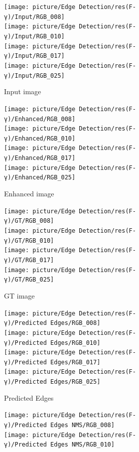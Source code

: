 \documentclass[a4paper]{ctexart}
\begin{document}
	\begin{figure}[htbp]
		\centering
		\begin{subfigure}{0.16\textwidth}
			\texttt{[image: picture/Edge Detection/res(F-γ)/Input/RGB\_008]} \\
			\texttt{[image: picture/Edge Detection/res(F-γ)/Input/RGB\_010]} \\
			\texttt{[image: picture/Edge Detection/res(F-γ)/Input/RGB\_017]} \\
			\texttt{[image: picture/Edge Detection/res(F-γ)/Input/RGB\_025]}
			\caption{Input image}
		\end{subfigure}
		\begin{subfigure}{0.16\textwidth}
			\texttt{[image: picture/Edge Detection/res(F-γ)/Enhanced/RGB\_008]} \\
			\texttt{[image: picture/Edge Detection/res(F-γ)/Enhanced/RGB\_010]} \\
			\texttt{[image: picture/Edge Detection/res(F-γ)/Enhanced/RGB\_017]} \\
			\texttt{[image: picture/Edge Detection/res(F-γ)/Enhanced/RGB\_025]}
			\caption{Enhanced image}
		\end{subfigure}
		\begin{subfigure}{0.16\textwidth}
			\texttt{[image: picture/Edge Detection/res(F-γ)/GT/RGB\_008]} \\
			\texttt{[image: picture/Edge Detection/res(F-γ)/GT/RGB\_010]} \\
			\texttt{[image: picture/Edge Detection/res(F-γ)/GT/RGB\_017]} \\
			\texttt{[image: picture/Edge Detection/res(F-γ)/GT/RGB\_025]}
			\caption{GT image}
		\end{subfigure}
		\begin{subfigure}{0.16\textwidth}
			\texttt{[image: picture/Edge Detection/res(F-γ)/Predicted Edges/RGB\_008]} \\
			\texttt{[image: picture/Edge Detection/res(F-γ)/Predicted Edges/RGB\_010]} \\
			\texttt{[image: picture/Edge Detection/res(F-γ)/Predicted Edges/RGB\_017]} \\
			\texttt{[image: picture/Edge Detection/res(F-γ)/Predicted Edges/RGB\_025]}
			\caption{Predicted Edges}
		\end{subfigure}
		\begin{subfigure}{0.16\textwidth}
			\texttt{[image: picture/Edge Detection/res(F-γ)/Predicted Edges NMS/RGB\_008]} \\
			\texttt{[image: picture/Edge Detection/res(F-γ)/Predicted Edges NMS/RGB\_010]} \\

\end{subfigure}
\end{figure}
\end{document}
